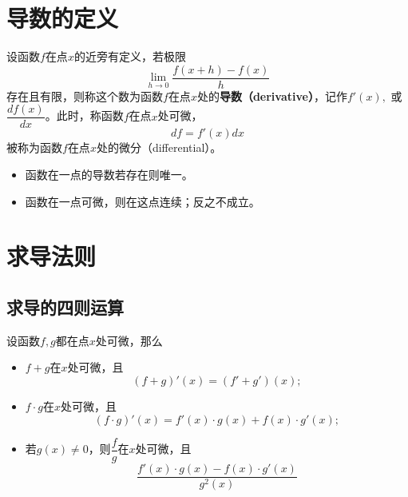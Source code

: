 \section{导数的定义} %
\begin{frame}

\begin{Def}
设函数$f$在点$x$的近旁有定义，若极限
$$\lim\limits_{h\to 0} \dfrac{f(x+h)-f(x)}{h}$$
存在且有限，则称这个数为函数$f$在点$x$处的{\bfseries 导数（derivative）}，记作$f'(x),$ 或$\dfrac{df(x)}{dx}$。此时，称函数$f$在点$x$处可微，
$$df = f'(x)dx$$
被称为函数$f$在点$x$处的微分（differential）。
\end{Def}

\pause

\begin{remark}
\begin{itemize}
\item 函数在一点的导数若存在则唯一。
\item 函数在一点可微，则在这点连续；反之不成立。
\end{itemize}
\end{remark}

\end{frame}


\section{求导法则}


\subsection{求导的四则运算}


\begin{frame}

设函数$f,g$都在点$x$处可微，那么
\begin{itemize}
\item<2-> $f+g$在$x$处可微，且
$$(f+g)'(x) = (f'+g')(x);$$
\item<3-> $f\cdot g$在$x$处可微，且
$$(f\cdot g)'(x) = f'(x)\cdot g(x) + f(x)\cdot g'(x);$$
\item<4-> 若$g(x)\neq0$，则$\dfrac{f}{g}$在$x$处可微，且
$$\dfrac{f'(x)\cdot g(x) - f(x)\cdot g'(x)}{g^2(x)}$$
\end{itemize}

\end{frame}

